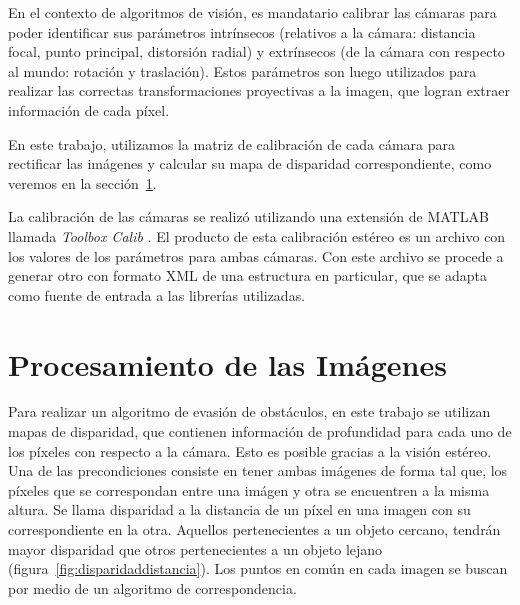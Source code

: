 \documentclass[journal]{IEEEtran}
\begin{document}
En el contexto de algoritmos de visi\'on, es mandatario calibrar las c\'amaras para poder identificar sus par\'ametros intr\'insecos (relativos a la c\'amara: distancia focal, punto principal, distorsi\'on radial) y extr\'insecos (de la c\'amara con respecto al mundo: rotaci\'on y traslaci\'on). Estos par\'ametros son luego utilizados para realizar las correctas transformaciones proyectivas a la imagen, que logran extraer informaci\'on de cada p\'ixel.

En este trabajo, utilizamos la matriz de calibraci\'on de cada c\'amara para rectificar las im\'agenes y calcular su mapa de disparidad correspondiente, como veremos en la secci\'on~\ref{sec:pro_img}.

La calibraci\'on de las c\'amaras se realiz\'o utilizando una extensi\'on de MATLAB llamada \emph{Toolbox Calib} \cite{B00}. El producto de esta calibraci\'on est\'ereo es un archivo con los valores de los par\'ametros para ambas c\'amaras. Con este archivo se procede a generar otro con formato XML de una estructura en particular, que se adapta como fuente de entrada a las librer\'ias utilizadas.

\section{Procesamiento de las Im\'agenes}
\label{sec:pro_img}

Para realizar un algoritmo de evasi\'on de obst\'aculos, en este trabajo se utilizan mapas de disparidad, que contienen informaci\'on de profundidad para cada uno de los p\'ixeles con respecto a la c\'amara. Esto es posible gracias a la visi\'on est\'ereo. Una de las precondiciones consiste en tener ambas im\'agenes de forma tal que, los p\'ixeles que se correspondan entre una im\'agen y otra se encuentren a la misma altura. Se llama disparidad a la distancia de un p\'ixel en una imagen con su correspondiente en la otra. Aquellos pertenecientes a un objeto cercano, tendr\'an mayor disparidad que otros pertenecientes a un objeto lejano (figura~\ref{fig:disparidaddistancia}). Los puntos en com\'un en cada imagen se buscan por medio de un algoritmo de correspondencia.
\end{document}
